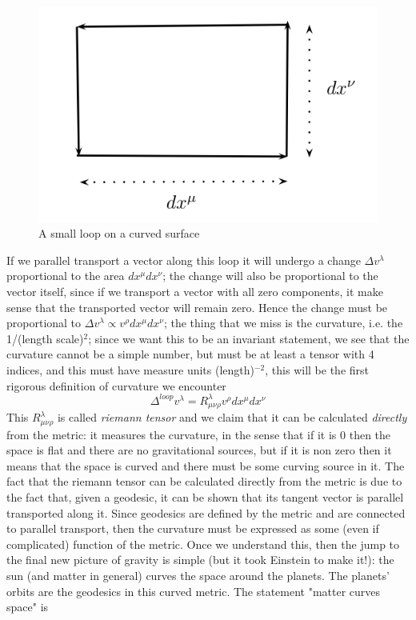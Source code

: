 \begin{figure}
\begin{center}
\includegraphics[scale=0.8]{Draw/loop.png}
\end{center}
\caption{A small loop on a curved surface}
\label{loop}
\end{figure}
If we parallel transport a vector along this loop it will undergo a change $\Delta v^\lambda$ proportional to the area $dx^\mu dx^\nu$; the change will also be proportional to the vector itself, since if we transport a vector with all zero components, it make sense that the transported vector will remain zero. Hence the change must be proportional to $\Delta v^\lambda\propto v^\rho dx^\mu dx^\nu$; the thing that we miss is the curvature, i.e. the 1/(length scale)$^2$; since we want this to be an invariant statement, we see that the curvature cannot be a simple number, but must be at least a tensor with 4 indices, and this must have measure units (length)$^{-2}$, this will be the first rigorous definition of curvature we encounter
\begin{equation}
\Delta^{loop}v^\lambda=R_{\mu\nu\rho}^\lambda v^\rho dx^\mu dx^\nu
\end{equation}
This $R_{\mu\nu\rho}^\lambda$ is called \textit{riemann tensor} and we claim that it can be calculated \textit{directly} from the metric: it measures the curvature, in the sense that if it is 0 then the space is flat and there are no gravitational sources, but if it is non zero then it means that the space is curved and there must be some curving source in it. The fact that the riemann tensor can be calculated directly from the metric is due to the fact that, given a geodesic, it can be shown that its tangent vector is parallel transported along it. Since geodesics are defined by the metric and are connected to parallel transport, then the curvature must be expressed as some (even if complicated) function of the metric. Once we understand this, then the jump to the final new picture of gravity is simple (but it took Einstein to make it!): the sun (and matter in general) curves the space around the planets. The planets' orbits are the geodesics in this curved metric. The statement "matter curves space" is 
